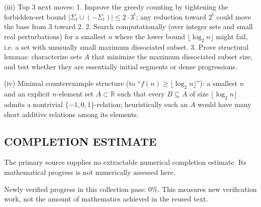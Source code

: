 (iii) Top 3 next moves:
1. Improve the greedy counting by tightening the forbidden-set bound $|\Sigma_t\cup(-\Sigma_t)|\le 2\cdot 3^t$; any reduction toward $2^t$ could move the base from $3$ toward $2$.
2. Search computationally (over integer sets and small real perturbations) for a smallest $n$ where the lower bound $\lfloor\log_2 n\rfloor$ might fail, i.e. a set with unusually small maximum dissociated subset.
3. Prove structural lemmas: characterize sets $A$ that minimize the maximum dissociated subset size, and test whether they are essentially initial segments or dense progressions.

(iv) Minimal counterexample structure (to “$f(n)\ge \lfloor\log_2 n\rfloor$”): a smallest $n$ and an explicit $n$-element set $A\subset\mathbb R$ such that every $B\subseteq A$ of size $\lfloor\log_2 n\rfloor$ admits a nontrivial $\{-1,0,1\}$-relation; heuristically such an $A$ would have many short additive relations among its elements.




\subsection*{COMPLETION ESTIMATE}
The primary source supplies no extractable numerical completion estimate. Its mathematical progress is not numerically assessed here.

Newly verified progress in this collection pass: $0\%$. This measures new verification work, not the amount of mathematics achieved in the reused text.
